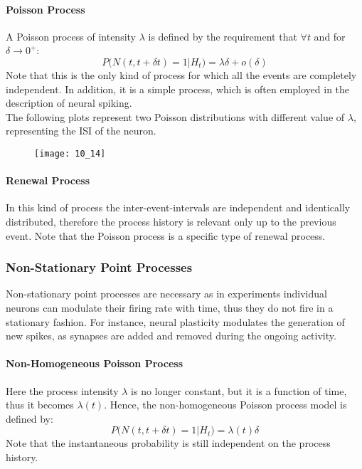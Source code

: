 \paragraph{Poisson Process} A Poisson process of intensity \(\lambda\) is defined by the requirement
that \(\forall{t}\) and for \(\delta\to{0^{+}}\):
\begin{equation*}
    P\bigl(N(t,t+\delta{t})=1|H_{t}\bigr)=\lambda{\delta}+o(\delta)
\end{equation*}
Note that this is the only kind of process for which all the events are completely independent.
In addition, it is a simple process, which is often employed in the description of neural spiking.\\
The following plots represent two Poisson distributions with different value of \(\lambda\),
representing the ISI of the neuron.
\begin{figure}[H]
    \texttt{[image: 10\_14]}
    \centering
\end{figure}
\paragraph{Renewal Process} In this kind of process the inter-event-intervals are independent
and identically distributed, therefore the process history is relevant only up to the previous
event. Note that the Poisson process is a specific type of renewal process.
\subsubsection{Non-Stationary Point Processes}
Non-stationary point processes are necessary as in experiments individual neurons can modulate
their firing rate with time, thus they do not fire in a stationary fashion. For instance, neural
plasticity modulates the generation of new spikes, as synapses are added and removed during the
ongoing activity.
\paragraph{Non-Homogeneous Poisson Process} Here the process intensity \(\lambda\) is no longer
constant, but it is a function of time, thus it becomes \(\lambda(t)\). Hence, the non-homogeneous
Poisson process model is defined by:
\begin{equation*}
    P\bigl(N(t,t+\delta{t})=1|H_{t}\bigr)=\lambda(t){\delta}
\end{equation*}
Note that the instantaneous probability is still independent on the process history.
